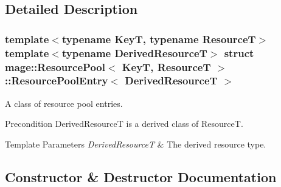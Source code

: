\subsection{Detailed Description}
\subsubsection*{template$<$typename KeyT, typename ResourceT$>$\newline
template$<$typename Derived\+ResourceT$>$\newline
struct mage\+::\+Resource\+Pool$<$ Key\+T, Resource\+T $>$\+::\+Resource\+Pool\+Entry$<$ Derived\+Resource\+T $>$}

A class of resource pool entries.

\begin{DoxyPrecond}{Precondition}
{\ttfamily Derived\+ResourceT} is a derived class of {\ttfamily ResourceT}. 
\end{DoxyPrecond}

\begin{DoxyTemplParams}{Template Parameters}
{\em Derived\+ResourceT} & The derived resource type. \\
\hline
\end{DoxyTemplParams}


\subsection{Constructor \& Destructor Documentation}
\hypertarget{structmage_1_1_resource_pool_1_1_resource_pool_entry_a90ac92f31efd6b6aebe4bf670b6dcec1}{}\label{structmage_1_1_resource_pool_1_1_resource_pool_entry_a90ac92f31efd6b6aebe4bf670b6dcec1} 
